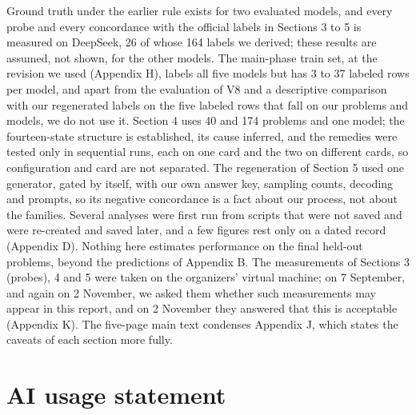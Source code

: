 \documentclass{article}
\begin{document}
Ground truth under the earlier rule exists for two evaluated models, and every probe and every concordance with the official labels in Sections 3 to 5 is measured on DeepSeek, 26 of whose 164 labels we derived; these results are assumed, not shown, for the other models. The main-phase train set, at the revision we used (Appendix H), labels all five models but has 3 to 37 labeled rows per model, and apart from the evaluation of V8 and a descriptive comparison with our regenerated labels on the five labeled rows that fall on our problems and models, we do not use it. Section 4 uses 40 and 174 problems and one model; the fourteen-state structure is established, its cause inferred, and the remedies were tested only in sequential runs, each on one card and the two on different cards, so configuration and card are not separated. The regeneration of Section 5 used one generator, gated by itself, with our own answer key, sampling counts, decoding and prompts, so its negative concordance is a fact about our process, not about the families. Several analyses were first run from scripts that were not saved and were re-created and saved later, and a few figures rest only on a dated record (Appendix D). Nothing here estimates performance on the final held-out problems, beyond the predictions of Appendix B. The measurements of Sections 3 (probes), 4 and 5 were taken on the organizers' virtual machine; on 7 September, and again on 2 November, we asked them whether such measurements may appear in this report, and on 2 November they answered that this is acceptable (Appendix K). The five-page main text condenses Appendix J, which states the caveats of each section more fully.

\section*{AI usage statement}
\end{document}
